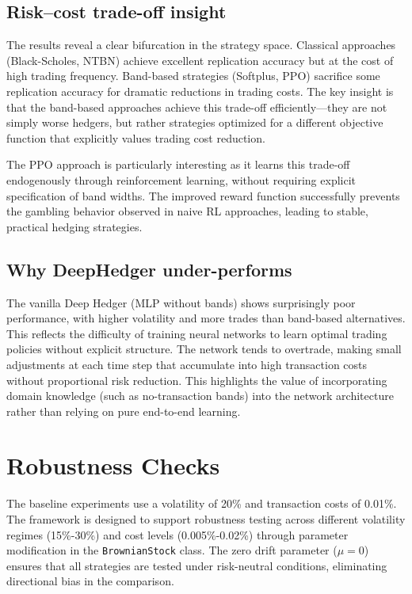 \documentclass[11pt,letterpaper]{article}
\begin{document}
\subsection{Risk--cost trade-off insight}
The results reveal a clear bifurcation in the strategy space. Classical approaches (Black-Scholes, NTBN) achieve excellent replication accuracy but at the cost of high trading frequency. Band-based strategies (Softplus, PPO) sacrifice some replication accuracy for dramatic reductions in trading costs. The key insight is that the band-based approaches achieve this trade-off efficiently—they are not simply worse hedgers, but rather strategies optimized for a different objective function that explicitly values trading cost reduction.

The PPO approach is particularly interesting as it learns this trade-off endogenously through reinforcement learning, without requiring explicit specification of band widths. The improved reward function successfully prevents the gambling behavior observed in naive RL approaches, leading to stable, practical hedging strategies.

\subsection{Why DeepHedger under-performs}
The vanilla Deep Hedger (MLP without bands) shows surprisingly poor performance, with higher volatility and more trades than band-based alternatives. This reflects the difficulty of training neural networks to learn optimal trading policies without explicit structure. The network tends to overtrade, making small adjustments at each time step that accumulate into high transaction costs without proportional risk reduction. This highlights the value of incorporating domain knowledge (such as no-transaction bands) into the network architecture rather than relying on pure end-to-end learning.

\section{Robustness Checks}
The baseline experiments use a volatility of 20\% and transaction costs of 0.01\%. The framework is designed to support robustness testing across different volatility regimes (15\%-30\%) and cost levels (0.005\%-0.02\%) through parameter modification in the \texttt{BrownianStock} class. The zero drift parameter ($\mu = 0$) ensures that all strategies are tested under risk-neutral conditions, eliminating directional bias in the comparison.
\end{document}
